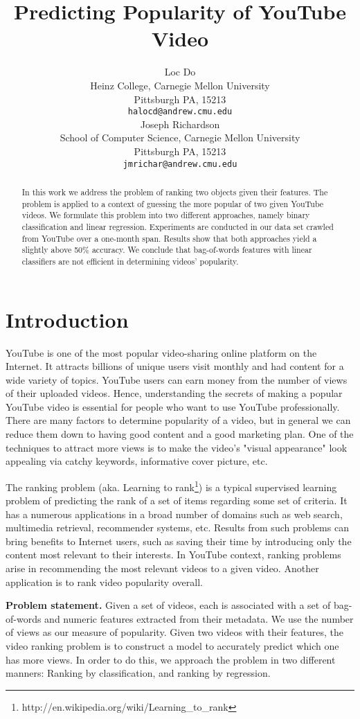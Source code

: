 \documentclass{article} %
\title{Predicting Popularity of YouTube Video}
\author{
Loc Do \\
Heinz College,
Carnegie Mellon University \\
Pittsburgh PA, 15213\\
\texttt{halocd@andrew.cmu.edu} \\
\And
Joseph Richardson \\
School of Computer Science,
Carnegie Mellon University \\
Pittsburgh PA, 15213 \\
\texttt{jmrichar@andrew.cmu.edu} \\
}
\begin{document}
\maketitle

\begin{abstract}
	In this work we address the problem of ranking two objects given their features. The problem is applied to a context of guessing the more popular of two given YouTube videos. We formulate this problem into two different approaches, namely binary classification and linear regression. Experiments are conducted in our data set crawled from YouTube over a one-month span. Results show that both approaches yield a slightly above 50\% accuracy. We conclude that bag-of-words features with linear classifiers are not efficient in determining videos' popularity.
\end{abstract}

\section{Introduction}
\label{sec:intro}
	YouTube is one of the most popular video-sharing online platform on the Internet. It attracts billions of unique users visit monthly and had content for a wide variety of topics. YouTube users can earn money from the number of views of their uploaded videos. Hence, understanding the secrets of making a popular YouTube video is essential for people who want to use YouTube professionally. There are many factors to determine popularity of a video, but in general we can reduce them down to having good content and a good marketing plan. One of the techniques to attract more views is to make the video's "visual appearance" look appealing via catchy keywords, informative cover picture, etc.

	The ranking problem (aka. Learning to rank\footnote{http://en.wikipedia.org/wiki/Learning\_to\_rank}) is a typical supervised learning problem of predicting the rank of a set of items regarding some set of criteria. It has a numerous applications in a broad number of domains such as web search, multimedia retrieval, recommender systems, etc. Results from such problems can bring benefits to Internet users, such as saving their time by introducing only the content most relevant to their interests. In YouTube context, ranking problems arise in recommending the most relevant videos to a given video. Another application is to rank video popularity overall.

	\textbf{Problem statement.} Given a set of videos, each is associated with a set of bag-of-words and numeric features extracted from their metadata. We use the number of views as our measure of popularity. Given two videos with their features, the video ranking problem is to construct a model to accurately predict which one has more views.  In order to do this, we approach the problem in two different manners:  Ranking by classification, and ranking by regression.
\end{document}
